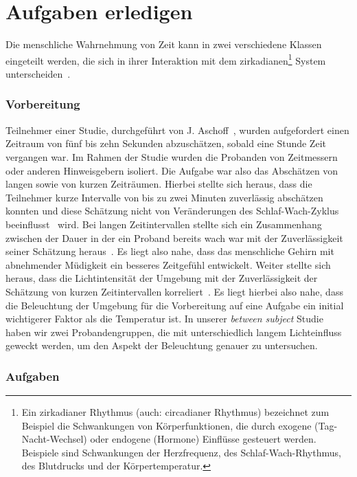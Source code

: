 \section{Aufgaben erledigen}\label{sec:relatedWork.aufgaben}

Die menschliche Wahrnehmung von Zeit kann in zwei verschiedene Klassen eingeteilt werden, die sich in ihrer Interaktion mit dem zirkadianen\footnote{Ein zirkadianer Rhythmus (auch: circadianer Rhythmus) bezeichnet zum Beispiel die Schwankungen von Körperfunktionen, die durch exogene (Tag-Nacht-Wechsel) oder endogene (Hormone) Einflüsse gesteuert werden. Beispiele sind Schwankungen der Herzfrequenz, des Schlaf-Wach-Rhythmus, des Blutdrucks und der Körpertemperatur.} System unterscheiden~\cite{aschoff1998human, aschoff1985perception}.

\subsubsection{Vorbereitung}

Teilnehmer einer Studie, durchgeführt von J. Aschoff~\cite{aschoff1998human}, wurden aufgefordert einen Zeitraum von fünf bis zehn Sekunden abzuschätzen, sobald eine Stunde Zeit vergangen war. Im Rahmen der Studie wurden die Probanden von Zeitmessern oder anderen Hinweisgebern isoliert.
Die Aufgabe war also das Abschätzen von langen sowie von kurzen Zeiträumen. 
Hierbei stellte sich heraus, dass die Teilnehmer kurze Intervalle von bis zu zwei Minuten zuverlässig abschätzen konnten und diese Schätzung nicht von Veränderungen des Schlaf-Wach-Zyklus beeinflusst~\cite{aschoff1998human} wird. 
Bei langen Zeitintervallen stellte sich ein Zusammenhang zwischen der Dauer in der ein Proband bereits wach war mit der Zuverlässigkeit seiner Schätzung heraus~\cite{aschoff1998human}. 
Es liegt also nahe, dass das menschliche Gehirn mit abnehmender Müdigkeit ein besseres Zeitgefühl entwickelt.
Weiter stellte sich heraus, dass die Lichtintensität der Umgebung mit der Zuverlässigkeit der Schätzung von kurzen Zeitintervallen korreliert~\cite{aschoff1998human}.
Es liegt hierbei also nahe, dass die Beleuchtung der Umgebung für die Vorbereitung auf eine Aufgabe ein initial wichtigerer Faktor als die Temperatur ist. 
In unserer \textit{between subject} Studie haben wir zwei Probandengruppen, die mit unterschiedlich langem Lichteinfluss geweckt werden, um den Aspekt der Beleuchtung genauer zu untersuchen.

\subsubsection{Aufgaben}

